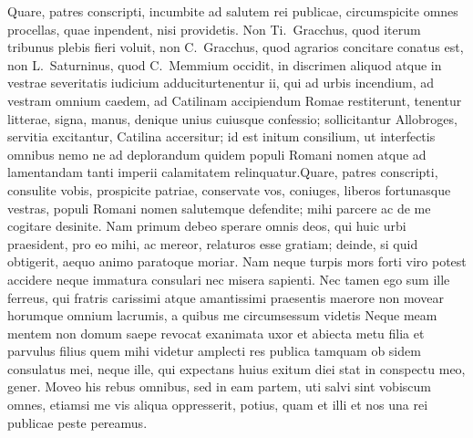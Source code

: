 \documentclass[a4paper,12pt,twoside,swedish]{report}
\begin{document}
Quare, patres conscripti, incumbite ad salutem rei publicae,
circumspicite omnes procellas, quae inpendent, nisi providetis. Non
Ti.~Gracchus, quod iterum tribunus plebis fieri voluit, non
C.~Gracchus, quod agrarios concitare conatus est, non L.~Saturninus,
quod C.~Memmium occidit, in discrimen aliquod atque in vestrae
severitatis iudicium adduciturtenentur ii, qui ad urbis incendium, ad
vestram omnium caedem, ad Catilinam accipiendum Romae restiterunt,
tenentur litterae, signa, manus, denique unius cuiusque confessio;
sollicitantur Allobroges, servitia excitantur, Catilina accersitur; id
est initum consilium, ut interfectis omnibus nemo ne ad deplorandum
quidem populi Romani nomen atque ad lamentandam tanti imperii
calamitatem relinquatur.Quare, patres conscripti, consulite vobis, prospicite patriae,
conservate vos, coniuges, liberos fortunasque vestras, populi Romani
nomen salutemque defendite; mihi parcere ac de me cogitare desinite. Nam
primum debeo sperare omnis deos, qui huic urbi praesident, pro eo mihi,
ac mereor, relaturos esse gratiam; deinde, si quid obtigerit, aequo
animo paratoque moriar. Nam neque turpis mors forti viro potest accidere
neque immatura consulari nec misera sapienti. Nec tamen ego sum ille
ferreus, qui fratris carissimi atque amantissimi praesentis maerore non
movear horumque omnium lacrumis, a quibus me circumsessum videtis Neque
meam mentem non domum saepe revocat exanimata uxor et abiecta metu filia
et parvulus filius quem mihi videtur amplecti res publica tamquam ob
sidem consulatus mei, neque ille, qui expectans huius exitum diei stat
in conspectu meo, gener. Moveo his rebus omnibus, sed in eam partem, uti
salvi sint vobiscum omnes, etiamsi me vis aliqua oppresserit, potius,
quam et illi et nos una rei publicae peste pereamus.
\end{document}
